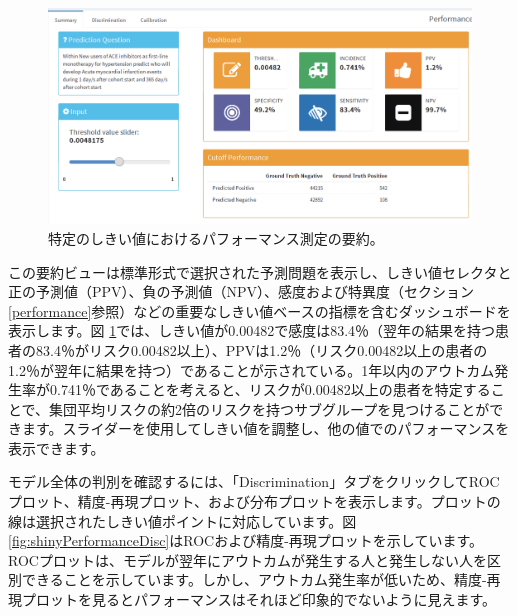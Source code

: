 \documentclass[
  11pt]{book}
\theoremstyle{definition}
\theoremstyle{definition}
\theoremstyle{definition}
\theoremstyle{definition}
\theoremstyle{remark}
\begin{document}
\begin{figure}

{\centering \includegraphics[width=1\linewidth]{images/PatientLevelPrediction/shiny/shinyPerformanceSum} 

}

\caption{特定のしきい値におけるパフォーマンス測定の要約。}\label{fig:shinyPerformanceSum}
\end{figure}

この要約ビューは標準形式で選択された予測問題を表示し、しきい値セレクタと正の予測値（PPV）、負の予測値（NPV）、感度および特異度（セクション \ref{performance}参照）などの重要なしきい値ベースの指標を含むダッシュボードを表示します。図 \ref{fig:shinyPerformanceSum}では、しきい値が0.00482で感度は83.4％（翌年の結果を持つ患者の83.4％がリスク0.00482以上）、PPVは1.2％（リスク0.00482以上の患者の1.2％が翌年に結果を持つ）であることが示されている。1年以内のアウトカム発生率が0.741％であることを考えると、リスクが0.00482以上の患者を特定することで、集団平均リスクの約2倍のリスクを持つサブグループを見つけることができます。スライダーを使用してしきい値を調整し、他の値でのパフォーマンスを表示できます。

モデル全体の判別を確認するには、「Discrimination」タブをクリックしてROCプロット、精度-再現プロット、および分布プロットを表示します。プロットの線は選択されたしきい値ポイントに対応しています。図 \ref{fig:shinyPerformanceDisc}はROCおよび精度-再現プロットを示しています。ROCプロットは、モデルが翌年にアウトカムが発生する人と発生しない人を区別できることを示しています。しかし、アウトカム発生率が低いため、精度-再現プロットを見るとパフォーマンスはそれほど印象的でないように見えます。
\end{document}
